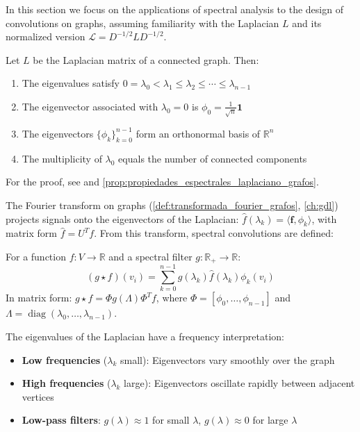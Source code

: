In this section we focus on the applications of spectral analysis to the design of convolutions on graphs, assuming familiarity with the Laplacian $L$ and its normalized version $\mathcal{L} = D^{-1/2} L D^{-1/2}$.

\begin{theorem}\label{thm:espectral_laplaciano}
Let $L$ be the Laplacian matrix of a connected graph. Then:
\begin{enumerate}
    \item The eigenvalues satisfy $0 = \lambda_0 < \lambda_1 \leq \lambda_2 \leq \cdots \leq \lambda_{n-1}$
    \item The eigenvector associated with $\lambda_0 = 0$ is $\phi_0 = \frac{1}{\sqrt{n}} \mathbf{1}$
    \item The eigenvectors $\{\phi_k\}_{k=0}^{n-1}$ form an orthonormal basis of $\mathbb{R}^n$
    \item The multiplicity of $\lambda_0$ equals the number of connected components
\end{enumerate}
For the proof, see \citep[Chapters~1--2]{Chung1997} and \autoref{prop:propiedades_espectrales_laplaciano_grafos}.
\end{theorem}

The Fourier transform on graphs (\autoref{def:transformada_fourier_grafos}, \autoref{ch:gdl}) projects signals onto the eigenvectors of the Laplacian: $\hat{f}(\lambda_k) = \langle \mathbf{f}, \phi_k \rangle$, with matrix form $\hat{f} = U^T f$. From this transform, spectral convolutions are defined:

\begin{definition}\label{def:convolucion_espectral_grafos}
For a function $f: V \to \mathbb{R}$ and a spectral filter $g: \mathbb{R}_+ \to \mathbb{R}$:
\begin{equation}
(g \star f)(v_i) = \sum_{k=0}^{n-1} g(\lambda_k) \hat{f}(\lambda_k) \phi_k(v_i)
\end{equation}
In matrix form: $g \star f = \Phi g(\Lambda) \Phi^T f$, where $\Phi = [\phi_0, \ldots, \phi_{n-1}]$ and $\Lambda = \operatorname{diag}(\lambda_0, \ldots, \lambda_{n-1})$.
\end{definition}

\begin{theorem}\label{thm:interpretacion_frecuencial_grafos}
The eigenvalues of the Laplacian have a frequency interpretation:
\begin{itemize}
    \item \textbf{Low frequencies} ($\lambda_k$ small): Eigenvectors vary smoothly over the graph
    \item \textbf{High frequencies} ($\lambda_k$ large): Eigenvectors oscillate rapidly between adjacent vertices
    \item \textbf{Low-pass filters}: $g(\lambda) \approx 1$ for small $\lambda$, $g(\lambda) \approx 0$ for large $\lambda$
\end{itemize}
\end{theorem}

